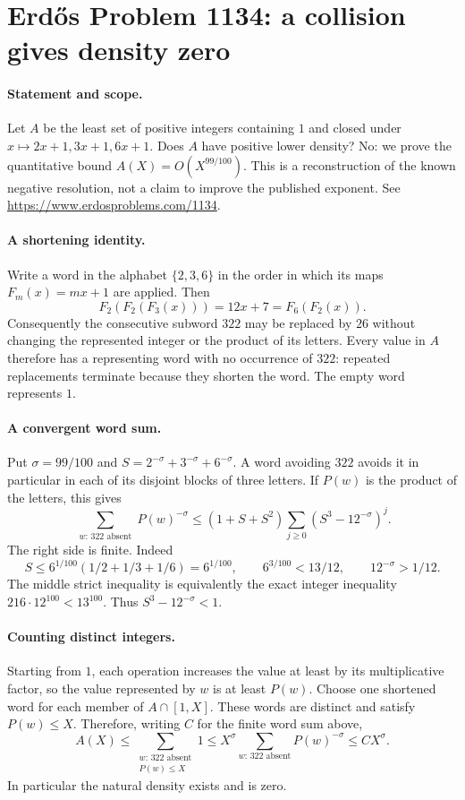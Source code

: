 \section*{Erd\H{o}s Problem 1134: a collision gives density zero}

\paragraph{Statement and scope.}
Let \(A\) be the least set of positive integers containing \(1\) and closed under \(x\mapsto2x+1,3x+1,6x+1\). Does \(A\) have positive lower density? No: we prove the quantitative bound \(A(X)=O(X^{99/100})\). This is a reconstruction of the known negative resolution, not a claim to improve the published exponent. See \url{https://www.erdosproblems.com/1134}.

\paragraph{A shortening identity.}
Write a word in the alphabet \(\{2,3,6\}\) in the order in which its maps \(F_m(x)=mx+1\) are applied. Then
\[
 F_2(F_2(F_3(x)))=12x+7=F_6(F_2(x)).
\]
Consequently the consecutive subword \(322\) may be replaced by \(26\) without changing the represented integer or the product of its letters. Every value in \(A\) therefore has a representing word with no occurrence of \(322\): repeated replacements terminate because they shorten the word. The empty word represents \(1\).

\paragraph{A convergent word sum.}
Put \(\sigma=99/100\) and \(S=2^{-\sigma}+3^{-\sigma}+6^{-\sigma}\). A word avoiding \(322\) avoids it in particular in each of its disjoint blocks of three letters. If \(P(w)\) is the product of the letters, this gives
\[
 \sum_{\substack{w:\,322\text{ absent}}}P(w)^{-\sigma}
 \leq (1+S+S^2)\sum_{j\geq0}(S^3-12^{-\sigma})^j.
\]
The right side is finite. Indeed
\[
 S\leq6^{1/100}(1/2+1/3+1/6)=6^{1/100},
 \qquad 6^{3/100}<13/12,\qquad 12^{-\sigma}>1/12.
\]
The middle strict inequality is equivalently the exact integer inequality
\(216\cdot12^{100}<13^{100}\). Thus \(S^3-12^{-\sigma}<1\).

\paragraph{Counting distinct integers.}
Starting from \(1\), each operation increases the value at least by its multiplicative factor, so the value represented by \(w\) is at least \(P(w)\).
Choose one shortened word for each member of \(A\cap[1,X]\). These words are distinct and satisfy \(P(w)\leq X\). Therefore, writing \(C\) for the finite word sum above,
\[
 A(X)\leq\sum_{\substack{w:\,322\text{ absent}\\P(w)\leq X}}1
 \leq X^\sigma\sum_{w:\,322\text{ absent}}P(w)^{-\sigma}
 \leq CX^\sigma.
\]
In particular the natural density exists and is zero.

